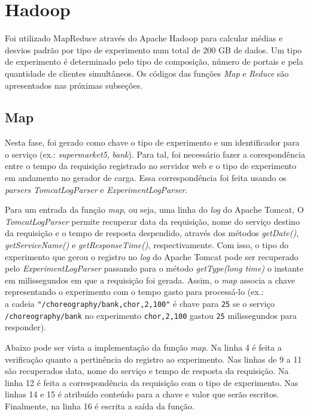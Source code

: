 \documentclass[brazil, a4paper,12pt]{article}
\begin{document}
\section{Hadoop}

Foi utilizado MapReduce através do Apache Hadoop para calcular médias e desvios
padrão por tipo de experimento num total de 200 GB de dados. Um tipo de
experimento é determinado pelo tipo de composição, número de portais e pela
quantidade de clientes simultâneos. Os códigos das funções \emph{Map} e
\emph{Reduce} são apresentados nas próximas subseções.

\subsection{Map}

Nesta fase, foi gerado como chave o tipo de experimento e um identificador para
o serviço (ex.: \emph{supermarket5}, \emph{bank}). Para tal, foi necessário
fazer a corespondência entre o tempo da requisição registrado no servidor web e
o tipo de experimento em andamento no gerador de carga. Essa correspondência
foi feita usando os \emph{parsers} \emph{TomcatLogParser} e
\emph{ExperimentLogParser}.

Para um entrada da função \emph{map}, ou seja, uma linha do \emph{log} do
Apache Tomcat, O \emph{TomcatLogParser} permite recuperar data da requisição,
       nome do serviço destino da requisição e o tempo de resposta despendido,
       através dos métodos \emph{getDate()}, \emph{getServiceName()} e
       \emph{getResponseTime()}, respectivamente. Com isso, o tipo do
       experimento que gerou o registro no \emph{log} do Apache Tomcat pode ser
       recuperado pelo \emph{ExperimentLogParser} passando para o método
       \emph{getType(long time)} o instante em milissegundos em que a
       requisição foi gerada. Assim, o \emph{map} associa a chave representando
       o experimento com o tempo gasto para processá-lo (ex.:\\ a cadeia
           \verb|"/choreography/bank,chor,2,100"| é chave para \verb|25| se o
           serviço\\ \verb|/choreography/bank| no experimento \verb|chor,2,100|
           gastou \verb|25| milissegundos para responder). 

Abaixo pode ser vista a implementação da função \emph{map}. Na linha 4 é feita
a verificação quanto a pertinência do registro ao experimento. Nas linhas de 9
a 11 são recuperados data, nome do serviço e tempo de resposta da requisição.
Na linha 12 é feita a correspondência da requisição com o tipo de experimento.
Nas linhas 14 e 15 é atribuído conteúdo para a chave e valor que serão
escritos. Finalmente, na linha 16 é escrita a saída da função.
\end{document}
